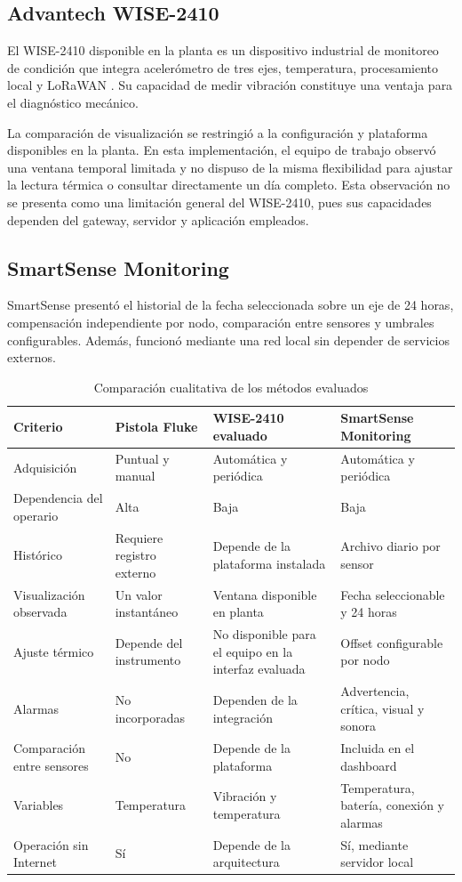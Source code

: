\documentclass[conference]{IEEEtran}
\begin{document}
\subsection{Advantech WISE-2410}

El WISE-2410 disponible en la planta es un dispositivo industrial de monitoreo de condición que integra acelerómetro de tres ejes, temperatura, procesamiento local y LoRaWAN \cite{wise2410}. Su capacidad de medir vibración constituye una ventaja para el diagnóstico mecánico.

La comparación de visualización se restringió a la configuración y plataforma disponibles en la planta. En esta implementación, el equipo de trabajo observó una ventana temporal limitada y no dispuso de la misma flexibilidad para ajustar la lectura térmica o consultar directamente un día completo. Esta observación no se presenta como una limitación general del WISE-2410, pues sus capacidades dependen del gateway, servidor y aplicación empleados.

\subsection{SmartSense Monitoring}

SmartSense presentó el historial de la fecha seleccionada sobre un eje de 24 horas, compensación independiente por nodo, comparación entre sensores y umbrales configurables. Además, funcionó mediante una red local sin depender de servicios externos.

\begin{table}[!t]
\caption{Comparación cualitativa de los métodos evaluados}
\label{tab:comparacion}
\centering
\footnotesize
\begin{tabularx}{\textwidth}{@{}p{2.8cm}XXX@{}}
\toprule
\textbf{Criterio} & \textbf{Pistola Fluke} & \textbf{WISE-2410 evaluado} & \textbf{SmartSense Monitoring} \\
\midrule
Adquisición & Puntual y manual & Automática y periódica & Automática y periódica \\
Dependencia del operario & Alta & Baja & Baja \\
Histórico & Requiere registro externo & Depende de la plataforma instalada & Archivo diario por sensor \\
Visualización observada & Un valor instantáneo & Ventana disponible en planta & Fecha seleccionable y 24 horas \\
Ajuste térmico & Depende del instrumento & No disponible para el equipo en la interfaz evaluada & Offset configurable por nodo \\
Alarmas & No incorporadas & Dependen de la integración & Advertencia, crítica, visual y sonora \\
Comparación entre sensores & No & Depende de la plataforma & Incluida en el dashboard \\
Variables & Temperatura & Vibración y temperatura & Temperatura, batería, conexión y alarmas \\
Operación sin Internet & Sí & Depende de la arquitectura & Sí, mediante servidor local \\
\bottomrule
\end{tabularx}
\end{table}
\end{document}

